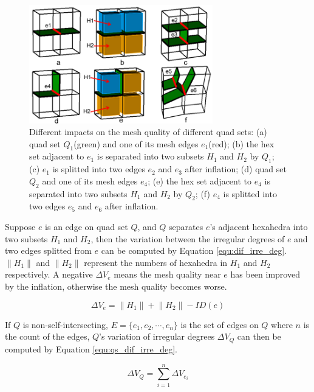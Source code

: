 \documentclass[final,5p,times,twocolumn]{elsarticle}
\begin{document}
\begin{figure}[htbp]
\begin{center}
\includegraphics[width=8cm]{quality_impact_qs.png}
\caption{Different impacts on the mesh quality of different quad sets: (a) quad set $Q_1$(green) and one of its mesh edges $e_1$(red); (b) the hex set adjacent to $e_1$ is separated into two subsets $H_1$ and $H_2$ by $Q_1$; (c) $e_1$ is splitted into two edges $e_2$ and $e_3$ after inflation; (d) quad set $Q_2$ and one of its mesh edges $e_4$; (e) the hex set adjacent to $e_4$ is separated into two subsets $H_1$ and $H_2$ by $Q_2$; (f) $e_4$ is splitted into two edges $e_5$ and $e_6$ after inflation.}
\label{fig:quality_impact_qs}
\end{center}
\end{figure}

Suppose $e$ is an edge on quad set $Q$, and $Q$ separates $e$'s adjacent hexahedra into two subsets $H_1$ and $H_2$, then the variation between the irregular degrees of $e$ and two edges splitted from $e$ can be computed by Equation \ref{equ:dif_irre_deg}. $\left \| H_1 \right \|$ and $\left \| H_2 \right \|$ represent the numbers of hexahedra in $H_1$ and $H_2$ respectively. A negative $\Delta V_e$ means the mesh quality near $e$ has been improved by the inflation, otherwise the mesh quality becomes worse.

\begin{equation}
\label{equ:dif_irre_deg}
\Delta V_e=\left \| H_1 \right \| + \left \| H_2 \right \|-ID(e)
\end{equation}

If $Q$ is non-self-intersecting, $E=\{e_1,e_2,\cdots,e_n\}$ is the set of edges on $Q$ where $n$ is the count of the edges, $Q$'s variation of irregular degrees $\Delta V_Q$ can then be computed by Equation \ref{equ:qs_dif_irre_deg}.

\begin{equation}
\label{equ:qs_dif_irre_deg}
\Delta V_Q=\sum_{i=1}^{n}\Delta V_{e_i}
\end{equation}
\end{document}
